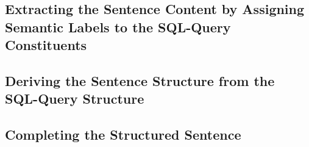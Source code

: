 \subsection{Extracting the Sentence Content by Assigning Semantic Labels to the SQL-Query Constituents}
\label{sec:des:planning}

\subsection{Deriving the Sentence Structure from the SQL-Query Structure}
\label{sec:des:structuring}

\subsection{Completing the Structured Sentence}
\label{sec:des:surface}





